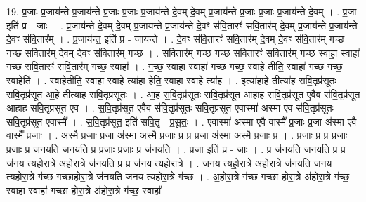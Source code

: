 \documentclass[17pt]{extarticle}
\begin{document}
19. प्र॒जाः प्र॒जाय॑न्ते प्र॒जाय॑न्ते प्र॒जाः प्र॒जाः प्र॒जाय॑न्ते दे॒वम् दे॒वम् प्र॒जाय॑न्ते प्र॒जाः प्र॒जाः प्र॒जाय॑न्ते दे॒वम् । . प्र॒जा इति॑ प्र - जाः । . प्र॒जाय॑न्ते दे॒वम् दे॒वम् प्र॒जाय॑न्ते प्र॒जाय॑न्ते दे॒वꣳ स॑वि॒तारꣳ॑ सवि॒तार॑म् दे॒वम् प्र॒जाय॑न्ते प्र॒जाय॑न्ते दे॒वꣳ स॑वि॒तार᳚म् । . प्र॒जाय॑न्त॒ इति॑ प्र - जाय॑न्ते । . दे॒वꣳ स॑वि॒तारꣳ॑ सवि॒तार॑म् दे॒वम् दे॒वꣳ स॑वि॒तार॑म् गच्छ गच्छ सवि॒तार॑म् दे॒वम् दे॒वꣳ स॑वि॒तार॑म् गच्छ । . स॒वि॒तार॑म् गच्छ गच्छ सवि॒तारꣳ॑ सवि॒तार॑म् गच्छ॒ स्वाहा॒ स्वाहा॑ गच्छ सवि॒तारꣳ॑ सवि॒तार॑म् गच्छ॒ स्वाहा᳚ । . ग॒च्छ॒ स्वाहा॒ स्वाहा॑ गच्छ गच्छ॒ स्वाहे तीति॒ स्वाहा॑ गच्छ गच्छ॒ स्वाहेति॑ । . स्वाहेतीति॒ स्वाहा॒ स्वाहे त्या॑हा॒ हेति॒ स्वाहा॒ स्वाहे त्या॑ह । . इत्या॑हा॒हे तीत्या॑ह सवि॒तृप्र॑सूतः सवि॒तृप्र॑सूत आ॒हे तीत्या॑ह सवि॒तृप्र॑सूतः । . आ॒ह॒ स॒वि॒तृप्र॑सूतः सवि॒तृप्र॑सूत आहाह सवि॒तृप्र॑सूत ए॒वैव स॑वि॒तृप्र॑सूत आहाह सवि॒तृप्र॑सूत ए॒व । . स॒वि॒तृप्र॑सूत ए॒वैव स॑वि॒तृप्र॑सूतः सवि॒तृप्र॑सूत ए॒वास्मा॑ अस्मा ए॒व स॑वि॒तृप्र॑सूतः सवि॒तृप्र॑सूत ए॒वास्मै᳚ । . स॒वि॒तृप्र॑सूत॒ इति॑ सवि॒तृ - प्र॒सू॒तः॒ । . ए॒वास्मा॑ अस्मा ए॒वै वास्मै᳚ प्र॒जाः प्र॒जा अ॑स्मा ए॒वै वास्मै᳚ प्र॒जाः । . अ॒स्मै॒ प्र॒जाः प्र॒जा अ॑स्मा अस्मै प्र॒जाः प्र प्र प्र॒जा अ॑स्मा अस्मै प्र॒जाः प्र । . प्र॒जाः प्र प्र प्र॒जाः प्र॒जाः प्र ज॑नयति जनयति॒ प्र प्र॒जाः प्र॒जाः प्र ज॑नयति । . प्र॒जा इति॑ प्र - जाः । . प्र ज॑नयति जनयति॒ प्र प्र ज॑नय त्यहोरा॒त्रे अ॑होरा॒त्रे ज॑नयति॒ प्र प्र ज॑नय त्यहोरा॒त्रे । . ज॒न॒य॒ त्य॒हो॒रा॒त्रे अ॑होरा॒त्रे ज॑नयति जनय त्यहोरा॒त्रे ग॑च्छ गच्छाहोरा॒त्रे ज॑नयति जनय त्यहोरा॒त्रे ग॑च्छ । . अ॒हो॒रा॒त्रे ग॑च्छ गच्छा होरा॒त्रे अ॑होरा॒त्रे ग॑च्छ॒ स्वाहा॒ स्वाहा॑ गच्छा होरा॒त्रे अ॑होरा॒त्रे ग॑च्छ॒ स्वाहा᳚ । \newline
\end{document}
